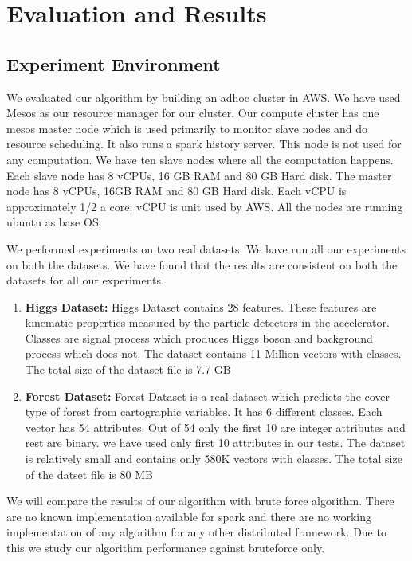 \chapter{Evaluation and Results} \label{chap:Evaluation and Results}

\section{Experiment Environment}

We evaluated our algorithm by building an adhoc cluster in AWS. We
have used Mesos as our resource manager for our cluster. Our compute
cluster has one mesos master node which is used
primarily to monitor slave nodes and do resource scheduling.
It also runs a spark history server. This node is not used for any computation.
We have ten slave nodes where all the computation happens. Each slave node has
8 vCPUs, 16 GB RAM and 80 GB Hard disk. The master node has 8 vCPUs,
16GB RAM and 80 GB Hard disk. Each vCPU is approximately 1/2 a
core. vCPU is unit used by AWS. All the nodes are running ubuntu as
base OS.

We performed experiments on two real datasets. We have run all our
experiments on both the datasets. We have found that the results are
consistent on both the datasets for all our experiments.

\begin{enumerate}
\item \textbf{Higgs Dataset:}
Higgs Dataset contains 28 features. These features are kinematic
properties measured by the particle detectors in the
accelerator. Classes are signal process which produces Higgs boson and
background process which does not. The dataset contains 11 Million
vectors with classes. The total size of the dataset file is 7.7 GB

\item \textbf{Forest Dataset:}
Forest Dataset is a real dataset which predicts the cover type of
forest from cartographic variables. It has 6 different classes. Each
vector has 54 attributes. Out of 54 only the first 10 are integer
attributes and rest are binary. we have used only first 10 attributes
in our tests. The dataset is relatively small and contains only 580K
vectors with classes. The total size of the datset file is 80 MB
\end{enumerate}

We will compare the results of our algorithm with brute force
algorithm. There are no known implementation available for spark and
there are no working implementation of any algorithm for any other
distributed framework. Due to this we study our algorithm performance
against bruteforce only.

